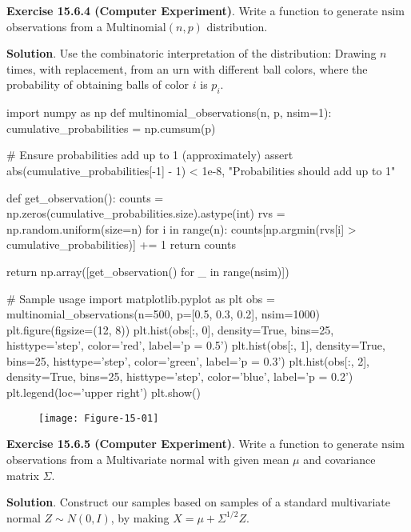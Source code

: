 \textbf{Exercise 15.6.4 (Computer Experiment)}. Write a function to
generate \(\text{nsim}\) observations from a
\(\text{Multinomial}(n, p)\) distribution.

\textbf{Solution}. Use the combinatoric interpretation of the
distribution: Drawing \(n\) times, with replacement, from an urn with
different ball colors, where the probability of obtaining balls of color
\(i\) is \(p_{i}\).

\begin{python}
import numpy as np
def multinomial_observations(n, p, nsim=1):
    cumulative_probabilities = np.cumsum(p)
    
    # Ensure probabilities add up to 1 (approximately)
    assert abs(cumulative_probabilities[-1] - 1) < 1e-8, "Probabilities should add up to 1"
    
    def get_observation():
        counts = np.zeros(cumulative_probabilities.size).astype(int)
        rvs = np.random.uniform(size=n)
        for i in range(n):
            counts[np.argmin(rvs[i] > cumulative_probabilities)] += 1
        return counts
    
    return np.array([get_observation() for _ in range(nsim)])
\end{python}

\begin{python}
# Sample usage
import matplotlib.pyplot as plt
obs = multinomial_observations(n=500, p=[0.5, 0.3, 0.2], nsim=1000)
plt.figure(figsize=(12, 8))
plt.hist(obs[:, 0], density=True, bins=25, histtype='step', color='red', label='p = 0.5')
plt.hist(obs[:, 1], density=True, bins=25, histtype='step', color='green', label='p = 0.3')
plt.hist(obs[:, 2], density=True, bins=25, histtype='step', color='blue', label='p = 0.2')
plt.legend(loc='upper right')
plt.show()
\end{python}

\begin{figure}[H]
\centering
\texttt{[image: Figure-15-01]}
\end{figure}


\textbf{Exercise 15.6.5 (Computer Experiment)}. Write a function to
generate \(\text{nsim}\) observations from a Multivariate normal with
given mean \(\mu\) and covariance matrix \(\Sigma\).

\textbf{Solution}. Construct our samples based on samples of a
standard multivariate normal \(Z \sim N(0, I)\), by making
\(X = \mu + \Sigma^{1/2} Z\).

